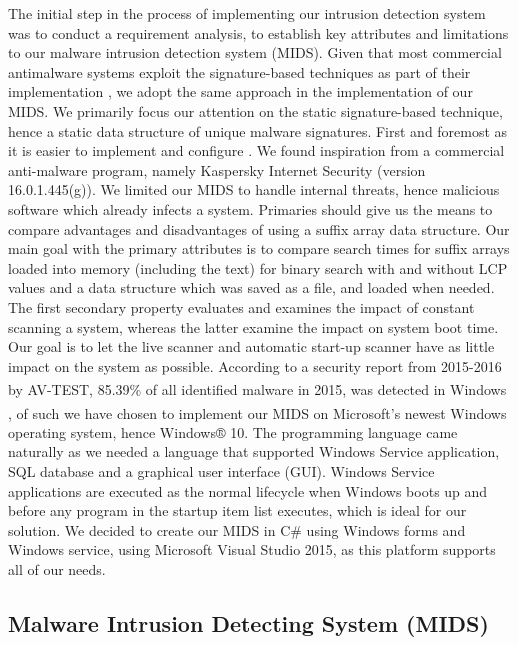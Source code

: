 \documentclass[12pt]{article} %
\begin{document}
The initial step in the process of implementing our intrusion detection system was to conduct a requirement analysis, to establish key attributes and limitations to our malware intrusion detection system (MIDS). Given that most commercial antimalware systems exploit the signature-based techniques as part of their implementation \cite{kruegel2003using}, we adopt the same approach in the implementation of our MIDS. We primarily focus our attention on the static signature-based technique, hence a static data structure of unique malware signatures. First and foremost as it is easier to implement and configure \cite{kruegel2003using}.  
We found inspiration from a commercial anti-malware program, namely Kaspersky Internet Security (version 16.0.1.445(g)). We limited our MIDS to handle internal threats, hence malicious software which already infects a system. 
Primaries should give us the means to compare advantages and disadvantages of using a suffix array data structure. Our main goal with the primary attributes is to compare search times for suffix arrays loaded into memory (including the text) for binary search with and without LCP values and a data structure which was saved as a file, and loaded when needed. The first secondary property evaluates and examines the impact of constant scanning a system, whereas the latter examine the impact on system boot time. Our goal is to let the live scanner and automatic start-up scanner have as little impact on the system as possible. 
According to a security report from 2015-2016 by AV-TEST, 85.39\% of all identified malware in 2015, was detected in Windows \textsuperscript{\textregistered} \cite{avtestreport}, of such we have chosen to implement our MIDS on Microsoft’s newest Windows\textsuperscript{\textregistered} operating system, hence Windows® 10. The programming language came naturally as we needed a language that supported Windows Service application, SQL database and a graphical user interface (GUI). Windows Service applications are executed as the normal lifecycle when Windows boots up and before any program in the startup item list executes, which is ideal for our solution. We decided to create our MIDS in C# using Windows forms and Windows service, using Microsoft Visual Studio 2015, as this platform supports all of our needs.

\subsection{Malware Intrusion Detecting System (MIDS)}
\end{document}
